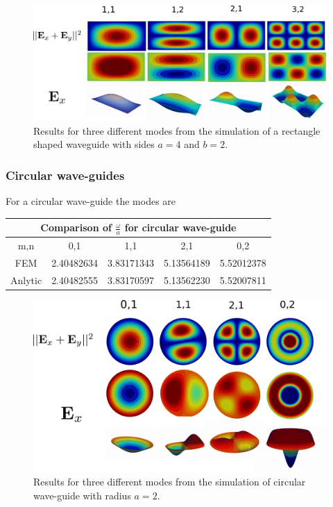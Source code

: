 \begin{figure}
\centering
\includegraphics[scale=0.1]{./img/rectangular_waveguide.pdf}
\caption{Results for three different modes from the simulation of a rectangle shaped waveguide with sides $a=4$ and $b=2$.}
\label{fig:rectangular_waveguide}
\end{figure}


\subsubsection{Circular wave-guides}

For a circular wave-guide the modes are 

\begin{center}
\begin{tabular}{|c|c|c|c|c|}
\hline
\multicolumn{5}{|c|}{Comparison of $\frac{\omega}{a}$ for circular wave-guide} \\
\hline 
m,n & 0,1 & 1,1 & 2,1 & 0,2 \\ 
\hline 
FEM     & 2.40482634 & 3.83171343 & 5.13564189 & 5.52012378 \\ 
\hline 
Anlytic & 2.40482555 & 3.83170597 & 5.13562230 & 5.52007811 \\ 
\hline 
\end{tabular} 
\label{tab:cir_wav_comparison}
\end{center}

\begin{figure}
\centering
\includegraphics[scale=0.1]{./img/circular_waveguide.pdf}
\caption{Results for three different modes from the simulation of circular wave-guide with radius $a=2$.}
\label{fig:circular_waveguide}
\end{figure}

